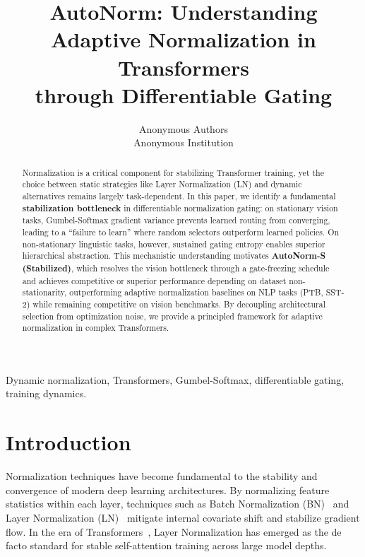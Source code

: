 \documentclass[conference]{IEEEtran}
\begin{document}
\title{AutoNorm: Understanding Adaptive Normalization in Transformers\\
      through Differentiable Gating}
\author{Anonymous Authors \\ Anonymous Institution}

\maketitle

\begin{abstract}
Normalization is a critical component for stabilizing Transformer
training, yet the choice between static strategies like Layer
Normalization (LN) and dynamic alternatives remains largely
task-dependent. In this paper, we identify a fundamental
\textbf{stabilization bottleneck} in differentiable normalization
gating: on stationary vision tasks, Gumbel-Softmax gradient variance
prevents learned routing from converging, leading to a ``failure to
learn'' where random selectors outperform learned policies. On
non-stationary linguistic tasks, however, sustained gating entropy
enables superior hierarchical abstraction. This mechanistic
understanding motivates \textbf{AutoNorm-S (Stabilized)}, which
resolves the vision bottleneck through a gate-freezing schedule and
achieves competitive or superior performance depending on dataset
non-stationarity, outperforming adaptive normalization baselines on
NLP tasks (PTB, SST-2) while remaining competitive on vision benchmarks. By decoupling architectural selection from optimization
noise, we provide a principled framework for adaptive normalization in
complex Transformers.
\end{abstract}

\begin{IEEEkeywords}
Dynamic normalization, Transformers, Gumbel-Softmax, differentiable
gating, training dynamics.
\end{IEEEkeywords}

\section{Introduction}

Normalization techniques have become fundamental to the stability
and convergence of modern deep learning architectures. By normalizing
feature statistics within each layer, techniques such as Batch
Normalization (BN)~\cite{ioffe2015batch} and Layer Normalization
(LN)~\cite{ba2016layernorm} mitigate internal covariate shift and
stabilize gradient flow. In the era of Transformers~\cite{vaswani2017attention},
Layer Normalization has emerged as the de facto standard for stable
self-attention training across large model depths.
\end{document}
